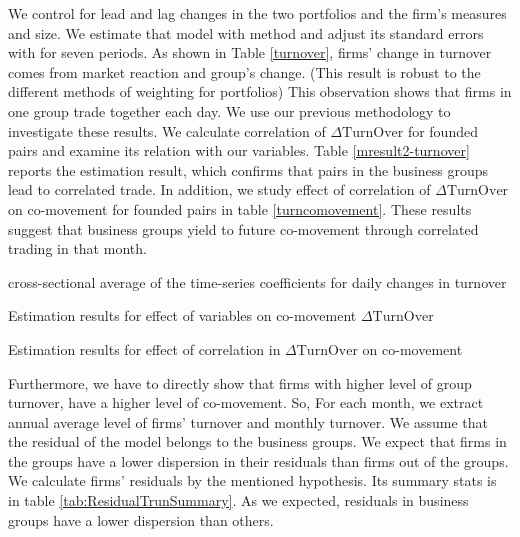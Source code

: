 	
  We control for lead and lag changes in the two portfolios and the firm's measures and size. We estimate that model with \cite{FamaMacBeth} method and adjust its standard errors with \cite{newey1987hypothesis} for seven periods.  As shown in Table \ref{turnover}, firms' change in turnover comes from market reaction and group's change. (This result is robust to the different methods of weighting for portfolios) This observation shows that firms in one group trade together each day. We use our previous methodology to investigate these results. We calculate correlation of $ \Delta \text{TurnOver} $ for founded pairs and examine its relation with our variables. Table \ref{mresult2-turnover} reports the estimation result, which confirms that pairs in the business groups lead to correlated trade. In addition, we study effect of  correlation of $ \Delta \text{TurnOver} $ on co-movement for founded pairs in table \ref{turncomovement}. These results suggest that business groups yield to future co-movement through correlated trading in that month.
{\begin{table}[htbp]
	\centering
	\caption{cross-sectional average of the time-series coefficients for daily changes in turnover }
	\resizebox{!}{!}{
		
	} \label{turnover}
\end{table}}


	\begin{table}[htbp]
		\centering
		\caption{Estimation results for effect of variables on  co-movement $ \Delta \text{TurnOver} $}
		\label{mresult2-turnover}
		\resizebox{\textwidth}{!}{
			\centering
			
		}
	\end{table}


	\begin{table}[htbp]
		\centering
		\caption{Estimation results for effect of correlation in $ \Delta \text{TurnOver} $ on  co-movement }
		\label{turncomovement}
		\resizebox{\textwidth}{!}{
			\centering
			
		}
	\end{table}




Furthermore, we have to directly show that firms with higher level of group turnover, have a higher level of co-movement. So, For each month, we extract annual average level of firms' turnover and monthly turnover. We assume that the residual of the model belongs to the business groups. We expect that firms in the groups have a lower dispersion in their residuals than firms out of the groups. We calculate firms' residuals by the mentioned hypothesis. Its summary stats is in table \ref{tab:ResidualTrunSummary}. As we expected, residuals in business groups have a lower dispersion than others.


